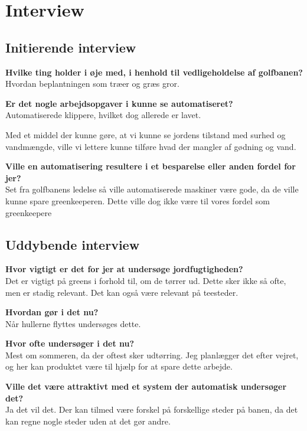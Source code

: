 \chapter{Interview} \label{cha:interviewKim}
\section*{Initierende interview}
\textbf{Hvilke ting holder i øje med, i henhold til vedligeholdelse af golfbanen?}\\
Hvordan beplantningen som træer og græs gror.

\textbf{Er det nogle arbejdsopgaver i kunne se automatiseret?}\\
Automatiserede klippere, hvilket dog allerede er lavet.

Med et middel der kunne gøre, at vi kunne se jordens tilstand med surhed og vandmængde, ville vi lettere kunne tilføre hvad der mangler af gødning og vand.

\textbf{Ville en automatisering resultere i et besparelse eller anden fordel for jer?}\\
Set fra golfbanens ledelse så ville automatiserede maskiner være gode, da de ville kunne spare greenkeeperen.
Dette ville dog ikke være til vores fordel som greenkeepere

\section*{Uddybende interview}

\textbf{Hvor vigtigt er det for jer at undersøge jordfugtigheden?}\\
Det er vigtigt på greens i forhold til, om de tørrer ud. Dette sker ikke så ofte, men er stadig relevant.
Det kan også være relevant på teesteder.

\textbf{Hvordan gør i det nu?}\\
Når hullerne flyttes undersøges dette.

\textbf{Hvor ofte undersøger i det nu?}\\
Mest om sommeren, da der oftest sker udtørring. Jeg planlægger det efter vejret, og her kan produktet være til hjælp for at spare dette arbejde.

\textbf{Ville det være attraktivt med et system der automatisk undersøger det?}\\
Ja det vil det. Der kan tilmed være forskel på forskellige steder på banen, da det kan regne nogle steder uden at det gør andre.

